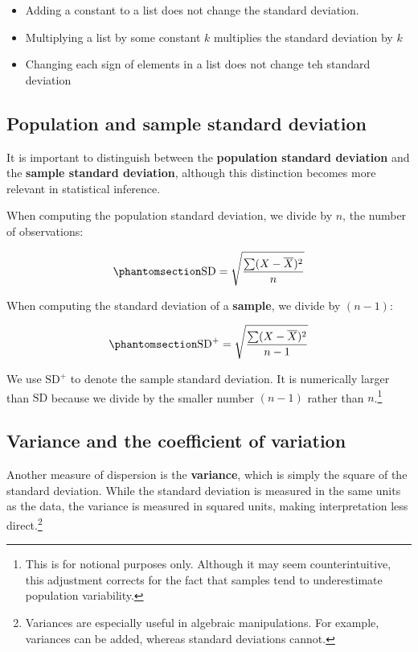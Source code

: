 \documentclass[
  letterpaper,
  DIV=11,
  numbers=noendperiod]{scrreprt}
\providecommand{\tightlist}{%
  \setlength{\itemsep}{0pt}\setlength{\parskip}{0pt}}
\begin{document}
\begin{itemize}
\tightlist
\item
  Adding a constant to a list does not change the standard deviation.
\item
  Multiplying a list by some constant \(k\) multiplies the standard
  deviation by \(k\)
\item
  Changing each sign of elements in a list does not change teh standard
  deviation
\end{itemize}

\subsection{Population and sample standard
deviation}\label{population-and-sample-standard-deviation}

It is important to distinguish between the \textbf{population standard
deviation} and the \textbf{sample standard deviation}, although this
distinction becomes more relevant in statistical inference.

When computing the population standard deviation, we divide by \(n\),
the number of observations:

\begin{equation}\phantomsection\label{eq-SD}{
\text{SD} = \sqrt{\frac{\sum (X - \overline{X})^2}{n}}
}\end{equation}

When computing the standard deviation of a \textbf{sample}, we divide by
\((n - 1)\):

\begin{equation}\phantomsection\label{eq-SD-plus}{
\text{SD}^+ = \sqrt{\frac{\sum (X - \overline{X})^2}{n - 1}}
}\end{equation}

We use \(\text{SD}^+\) to denote the sample standard deviation. It is
numerically larger than \(\text{SD}\) because we divide by the smaller
number \((n - 1)\) rather than \(n\).\footnote{This is for notional
  purposes only. Although it may seem counterintuitive, this adjustment
  corrects for the fact that samples tend to underestimate population
  variability.}

\subsection{Variance and the coefficient of
variation}\label{variance-and-the-coefficient-of-variation}

Another measure of dispersion is the \textbf{variance}, which is simply
the square of the standard deviation. While the standard deviation is
measured in the same units as the data, the variance is measured in
squared units, making interpretation less direct.\footnote{Variances are
  especially useful in algebraic manipulations. For example, variances
  can be added, whereas standard deviations cannot.}
\end{document}
